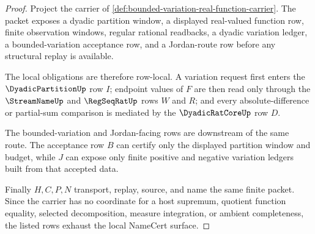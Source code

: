 \begin{proof}
Project the carrier of \autoref{def:bounded-variation-real-function-carrier}. The packet exposes a dyadic partition window, a displayed real-valued function row, finite observation windows, regular rational readbacks, a dyadic variation ledger, a bounded-variation acceptance row, and a Jordan-route row before any structural replay is available.

The local obligations are therefore row-local. A variation request first enters the $\DyadicPartitionUp$ row $I$; endpoint values of $F$ are then read only through the $\StreamNameUp$ and $\RegSeqRatUp$ rows $W$ and $R$; and every absolute-difference or partial-sum comparison is mediated by the $\DyadicRatCoreUp$ row $D$.

The bounded-variation and Jordan-facing rows are downstream of the same route. The acceptance row $B$ can certify only the displayed partition window and budget, while $J$ can expose only finite positive and negative variation ledgers built from that accepted data.

Finally $H,C,P,N$ transport, replay, source, and name the same finite packet. Since the carrier has no coordinate for a host supremum, quotient function equality, selected decomposition, measure integration, or ambient completeness, the listed rows exhaust the local NameCert surface.
\end{proof}

